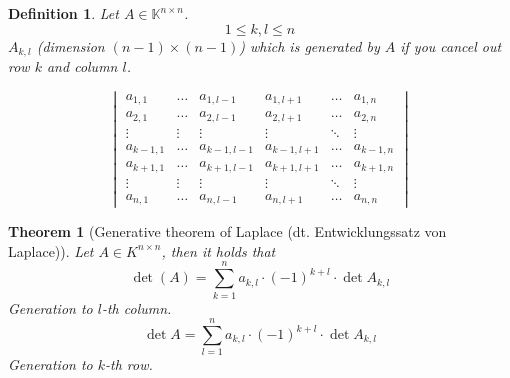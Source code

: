 \documentclass[a4paper,landscape,twocolumn]{article}
\newtheorem{theorem}{Theorem}
\newtheorem{defi}{Definition}
\begin{document}
\begin{defi}
  \label{definition-7.36}
  Let $A \in \mathbb K^{n\times n}$.
  \[ 1 \leq k, l \leq n \]
  $A_{k,l}$ (dimension $(n-1) \times (n-1)$) which is generated by $A$ if you cancel out row $k$ and column $l$.

  \[
    \begin{vmatrix}
      a_{1,1} & \ldots & a_{1,l-1} & a_{1,l+1} & \ldots & a_{1,n} \\
      a_{2,1} & \ldots & a_{2,l-1} & a_{2,l+1} & \ldots & a_{2,n} \\
      \vdots & \vdots & \vdots    & \vdots    & \ddots & \vdots \\
      a_{k-1,1} & \ldots & a_{k-1,l-1} & a_{k-1,l+1} & \ldots & a_{k-1,n} \\
      a_{k+1,1} & \ldots & a_{k+1,l-1} & a_{k+1,l+1} & \ldots & a_{k+1,n} \\
      \vdots & \vdots & \vdots    & \vdots    & \ddots & \vdots \\
      a_{n,1} & \ldots & a_{n,l-1} & a_{n,l+1} & \ldots & a_{n,n}
    \end{vmatrix}
  \]
\end{defi}

\begin{theorem}[Generative theorem of Laplace (dt. Entwicklungssatz von Laplace)]
  \label{thm:laplace-entwicklung}
  Let $A \in K^{n\times n}$, then it holds that
  \[ \det(A) = \sum_{k=1}^n a_{k,l} \cdot (-1)^{k+l} \cdot \det{A_{k,l}} \]
  Generation to $l$-th column.
  \[ \det{A} = \sum_{l=1}^n a_{k,l} \cdot (-1)^{k+l} \cdot \det{A_{k,l}} \]
  Generation to $k$-th row.
\end{theorem}
\end{document}
